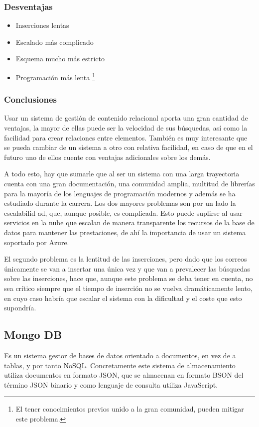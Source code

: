 \subsubsection{Desventajas}
\begin{itemize}
    \item Inserciones lentas
    \item Escalado más complicado
    \item Esquema mucho más estricto
    \item Programación más lenta \footnote{El tener conocimientos previos unido a la gran comunidad, pueden mitigar este problema.}
\end{itemize}

\subsubsection{Conclusiones}

Usar un sistema de gestión de contenido relacional aporta una gran cantidad de ventajas, la mayor de ellas puede ser la velocidad de sus búsquedas, así como la facilidad para crear relaciones entre elementos. También es muy interesante que se pueda cambiar de un sistema a otro con relativa facilidad, en caso de que en el futuro uno de ellos cuente con ventajas adicionales sobre los demás. 

A todo esto, hay que sumarle que al ser un sistema con una larga trayectoria cuenta con una gran documentación, una comunidad amplia, multitud de librerías para la mayoría de los lenguajes de programación modernos y además se ha estudiado durante la carrera.
Los dos mayores problemas son por un lado la escalabilid
ad, que, aunque posible, es complicada. Esto puede suplirse al usar servicios en la nube que escalan de manera transparente los recursos de la base de datos para mantener las prestaciones, de ahí la importancia de usar un sistema soportado por Azure. 

El segundo problema es la lentitud de las inserciones, pero dado que los correos únicamente se van a insertar una única vez y que van a prevalecer las búsquedas sobre las inserciones, hace que, aunque este problema se deba tener en cuenta, no sea crítico siempre que el tiempo de inserción no se vuelva dramáticamente lento, en cuyo caso habría que escalar el sistema con la dificultad y el coste que esto supondría.

\subsection{Mongo DB}
Es un sistema gestor de bases de datos orientado a documentos, en vez de a tablas, y por tanto NoSQL. Concretamente este sistema de almacenamiento utiliza documentos en formato JSON, que se almacenan en formato BSON del término JSON binario y como lenguaje de consulta utiliza JavaScript.

